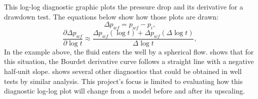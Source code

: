 \noindent
%
This log-log diagnostic graphic plots the pressure drop and its derivative for a drawdown test.
%
The equations below show how those plots are drawn:
%
%
\begin{equation}
	\label{equation-pressure-drop}
	\Delta p_{wf} = p_{wf} - p_i,
\end{equation}
%
\begin{equation}
	\label{equation-pressure-drop_derivative}
	\frac{\partial \Delta p_{wf}}{\partial \log t} \approx \frac{\Delta p_{wf}(\log t) + \Delta p_{wf}(\Delta \log t)}{\Delta \log t},
\end{equation}
%
In the example above, the fluid enters the well by a spherical flow.
%
\cite{Bourdet2002} shows that for this situation, the Bourdet derivative curve follows a straight line with a negative half-unit slope.
%
\cite{Bourdet2002} shows several other diagnostics that could be obtained in well tests by similar analysis.
%
This project's focus is limited to evaluating how this diagnostic log-log plot will change from a model before and after its upscaling.

